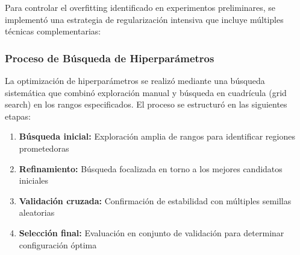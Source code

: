 Para controlar el overfitting identificado en experimentos preliminares, se implementó una estrategia de regularización intensiva que incluye múltiples técnicas complementarias:

\begin{table}[htbp]
\centering
{}
\caption{Estrategias de regularización implementadas para controlar overfitting.}
\label{tab:regularizacion_distilbert}
\end{table}

\subsubsection{Proceso de Búsqueda de Hiperparámetros}

La optimización de hiperparámetros se realizó mediante una búsqueda sistemática que combinó exploración manual y búsqueda en cuadrícula (grid search) en los rangos especificados. El proceso se estructuró en las siguientes etapas:

\begin{enumerate}
    \item \textbf{Búsqueda inicial:} Exploración amplia de rangos para identificar regiones prometedoras
    \item \textbf{Refinamiento:} Búsqueda focalizada en torno a los mejores candidatos iniciales
    \item \textbf{Validación cruzada:} Confirmación de estabilidad con múltiples semillas aleatorias
    \item \textbf{Selección final:} Evaluación en conjunto de validación para determinar configuración óptima
\end{enumerate}

